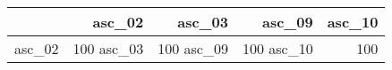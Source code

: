 \begin{tabular}{lrrrr}
\toprule
 & asc_02 & asc_03 & asc_09 & asc_10 \\
\midrule
asc_02 & 100%
asc_03 & 100%
asc_09 & 100%
asc_10 & 100%
\bottomrule
\end{tabular}
